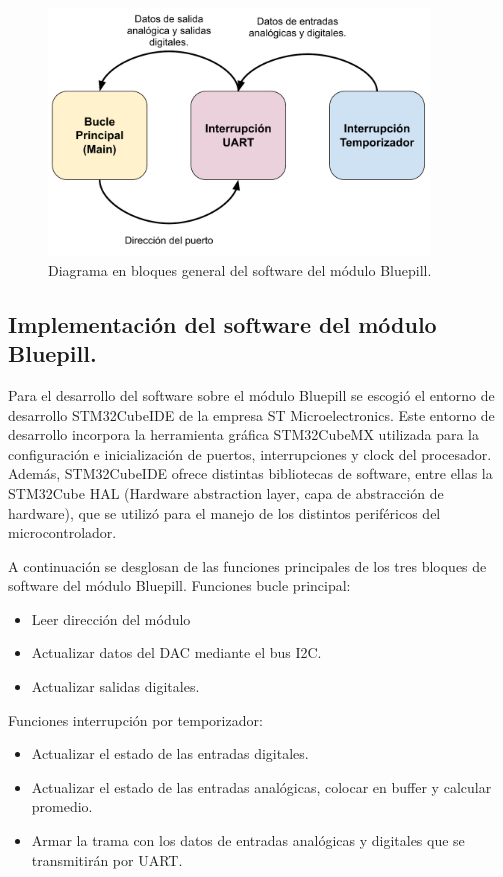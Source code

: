 \begin{figure}[H]
	\centering
	\includegraphics[width=0.9\textwidth]{./Figures/TareasSTM32.pdf}
	\caption{Diagrama en bloques general del software del módulo Bluepill.}
	\label{fig:TareasSTM32}
\end{figure}

\subsection{Implementación del software del módulo Bluepill.}
Para el desarrollo del software sobre el módulo Bluepill se escogió el entorno de desarrollo STM32CubeIDE de la empresa ST Microelectronics. Este entorno de desarrollo incorpora la herramienta gráfica STM32CubeMX utilizada para la configuración e inicialización de puertos, interrupciones y clock del procesador. Además, STM32CubeIDE ofrece distintas bibliotecas de software, entre ellas la STM32Cube HAL (Hardware abstraction layer, capa de abstracción de hardware), que se utilizó para el manejo de los distintos periféricos del microcontrolador.

A continuación se desglosan de las funciones principales de los tres bloques de software del módulo Bluepill.
Funciones bucle principal:
\begin{itemize}
	\item Leer dirección del módulo
	\item Actualizar datos del DAC mediante el bus I2C.
	\item Actualizar salidas digitales.
\end{itemize}

Funciones interrupción por temporizador:
\begin{itemize}
	\item Actualizar el estado de las entradas digitales.
	\item Actualizar el estado de las entradas analógicas, colocar en buffer y calcular promedio.
	\item Armar la trama con los datos de entradas analógicas y digitales que se transmitirán por UART.
\end{itemize}

